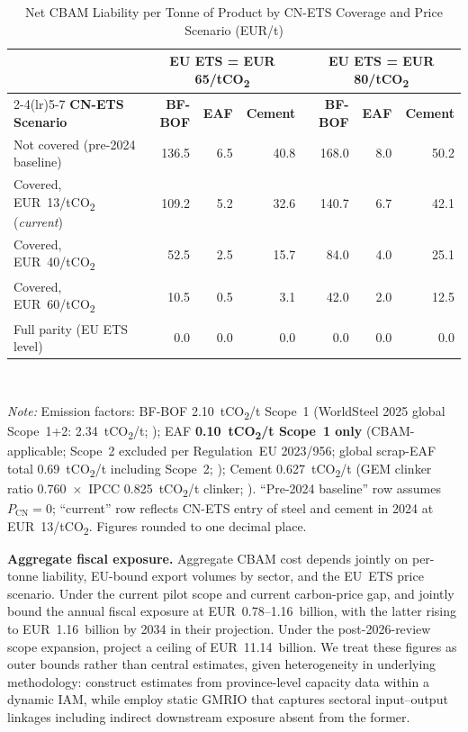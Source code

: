 \documentclass[letterpaper, 10pt, conference]{ieeeconf}
\begin{document}
\begin{table}[t]
\caption{Net CBAM Liability per Tonne of Product by CN-ETS Coverage
  and Price Scenario (EUR/t)}
\label{tab:cbam_liability}
\centering
\small
\begin{tabular}{lrrrrrr}
\toprule
 & \multicolumn{3}{c}{\textbf{EU ETS = EUR 65/tCO\textsubscript{2}}}
 & \multicolumn{3}{c}{\textbf{EU ETS = EUR 80/tCO\textsubscript{2}}} \\
\cmidrule(lr){2-4}\cmidrule(lr){5-7}
\textbf{CN-ETS Scenario}
  & \textbf{BF-BOF} & \textbf{EAF} & \textbf{Cement}
  & \textbf{BF-BOF} & \textbf{EAF} & \textbf{Cement} \\
\midrule
Not covered (pre-2024 baseline)                          & 136.5 &  6.5 & 40.8 & 168.0 &  8.0 & 50.2 \\
Covered, EUR~13/tCO\textsubscript{2} (\textit{current}) & 109.2 &  5.2 & 32.6 & 140.7 &  6.7 & 42.1 \\
Covered, EUR~40/tCO\textsubscript{2}                    &  52.5 &  2.5 & 15.7 &  84.0 &  4.0 & 25.1 \\
Covered, EUR~60/tCO\textsubscript{2}                    &  10.5 &  0.5 &  3.1 &  42.0 &  2.0 & 12.5 \\
Full parity (EU ETS level)                               &   0.0 &  0.0 &  0.0 &   0.0 &  0.0 &  0.0 \\
\bottomrule
\end{tabular}
\\[4pt]
\begin{minipage}{0.95\linewidth}
\footnotesize\textit{Note:} Emission factors: BF-BOF
2.10~tCO\textsubscript{2}/t Scope~1 (WorldSteel 2025 global
Scope~1+2: 2.34~tCO\textsubscript{2}/t; \citealt{WorldSteel2025});
EAF \textbf{0.10~tCO\textsubscript{2}/t Scope~1 only}
(CBAM-applicable; Scope~2 excluded per Regulation~EU 2023/956;
global scrap-EAF total 0.69~tCO\textsubscript{2}/t including Scope~2;
\citealt{WorldSteel2025}); Cement
0.627~tCO\textsubscript{2}/t (GEM clinker ratio
0.760~$\times$~IPCC 0.825~tCO\textsubscript{2}/t clinker;
\citealt{IPCC2006}). ``Pre-2024 baseline'' row assumes
$P_{\mathrm{CN}}=0$; ``current'' row reflects CN-ETS entry of steel
and cement in 2024 at EUR~13/tCO\textsubscript{2}.
Figures rounded to one decimal place.
\end{minipage}
\end{table}

\textbf{Aggregate fiscal exposure.} Aggregate CBAM cost depends
jointly on per-tonne liability, EU-bound export volumes by sector,
and the EU~ETS price scenario. Under the current pilot scope and
current carbon-price gap, \citet{Li2026} and \citet{Pan2025} jointly
bound the annual fiscal exposure at EUR~0.78--1.16~billion, with the
latter rising to EUR~1.16~billion by 2034 in their projection. Under
the post-2026-review scope expansion, \citet{Li2026} project a ceiling
of EUR~11.14~billion. We treat these figures as outer bounds rather
than central estimates, given heterogeneity in underlying methodology:
\citet{Pan2025} construct estimates from province-level capacity data
within a dynamic IAM, while \citet{Li2026} employ static GMRIO that
captures sectoral input--output linkages including indirect downstream
exposure absent from the former.
\end{document}
